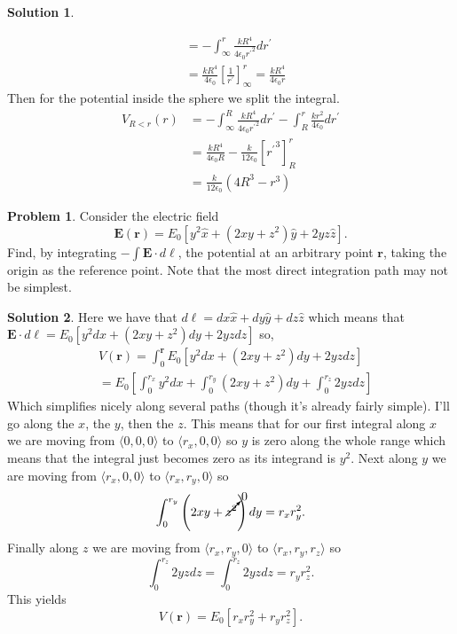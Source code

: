 \documentclass[10pt]{article}
\theoremstyle{definition}
\newtheorem{problem}{Problem}
\newtheorem{soln}{Solution}
\newcommand{\ux}{\hat{x}}
\newcommand{\uy}{\hat{y}}
\newcommand{\uz}{\hat{z}}
\newcommand{\primed}[1]{#1^\prime}
\begin{document}
\begin{soln}
\begin{enumerate}[label=(\roman*)]
\begin{align*}
                       & =-\int_\infty^r\frac{kR^4}{4\epsilon_0 {\primed{r}}^2}d\primed{r}                             \\
                       & =\frac{kR^4}{4\epsilon_0}\left[\frac{1}{\primed{r}}\right]_\infty^r=\frac{kR^4}{4\epsilon_0r}
          \end{align*}
          Then for the potential inside the sphere we split the integral. 
          \begin{align*}
            V_{R<r}(r) & =-\int_\infty^R\frac{kR^4}{4\epsilon_0 {\primed{r}}^2}d\primed{r}-\int_R^r\frac{kr^2}{4\epsilon_0}d\primed{r} \\
                       & =\frac{kR^4}{4\epsilon_0R}-\frac{k}{12\epsilon_0}\left[{\primed{r}}^3\right]_R^r                              \\
                       & =\frac{k}{12\epsilon_0}\left(4R^3-r^3\right)
          \end{align*}
  \end{enumerate}
\end{soln}

\begin{problem}
Consider the electric field
$$\mathbf{E}(\mathbf{r})=E_0\left[y^2\ux+\left(2xy+z^2\right)\uy+2yz\uz\right].$$
Find, by integrating $-\int\mathbf{E}\cdot d\boldsymbol{\ell}$, the potential at an arbitrary point $\mathbf{r}$, taking the origin as the reference point.
Note that the most direct integration path may not be simplest.
\end{problem}
\begin{soln}
  Here we have that $d\boldsymbol{\ell}=dx\ux+dy\uy+dz\uz$ which means that
  $\mathbf{E}\cdot d\boldsymbol{\ell}=E_0\left[y^2dx+\left(2xy+z^2\right)dy+2yzdz\right]$ so,
  \begin{align*}
     & V(\mathbf{r})= \int_0^{\mathbf{r}}E_0\left[y^2dx+\left(2xy+z^2\right)dy+2yzdz\right]     \\
     & = E_0\left[\int_0^{r_x}y^2dx+\int_0^{r_y}\left(2xy+z^2\right)dy+\int_0^{r_z}2yzdz\right]
  \end{align*}
  Which simplifies nicely along several paths (though it's already fairly simple). I'll go along the $x$, the $y$, then the $z$.
  This means that for our first integral along $x$ we are moving from $\langle0,0,0\rangle$ to $\langle r_x,0,0\rangle$ so $y$ is zero
  along the whole range which means that the integral just becomes zero as its integrand is $y^2$. Next along
  $y$ we are moving from $\langle r_x,0,0\rangle$ to $\langle r_x,r_y,0\rangle$ so
  $$\int_0^{r_y}\left(2xy+\cancelto{0}{z^2}\right)dy=r_xr_y^2.$$
  Finally along $z$ we are moving from $\langle r_x,r_y,0\rangle$ to $\langle r_x,r_y,r_z\rangle$ so
  $$\int_0^{r_z}2yzdz=\int_0^{r_z}2yzdz=r_yr_z^2.$$
  This yields
  $$V(\mathbf{r})=E_0\left[r_xr_y^2 + r_yr_z^2\right].$$
\end{soln}
\end{document}
